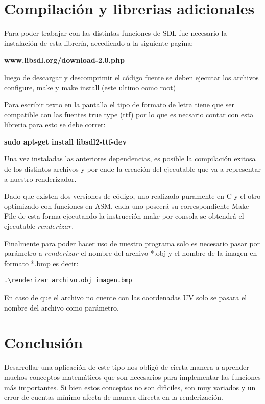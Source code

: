 \documentclass[a4paper]{article}
\begin{document}
\section{Compilación y librerias adicionales}

Para poder trabajar con las distintas funciones de SDL fue necesario la instalación de esta librería, accediendo a la siguiente pagina:  

\textbf{www.libsdl.org/download-2.0.php}

luego de descargar y descomprimir el código fuente se deben ejecutar los archivos configure, make y make install (este ultimo como root)


Para escribir texto en la pantalla el tipo de formato de letra tiene que ser compatible con las fuentes true type (ttf) por lo que es necsario contar con esta libreria para esto se debe correr: 


\textbf{sudo apt-get install libsdl2-ttf-dev}


Una vez instaladas las anteriores dependencias, es posible la compilación exitosa de los distintos archivos y por ende la creación del ejecutable que va a representar a nuestro renderizador.
\par Dado que existen dos versiones de código, uno realizado puramente en C y el otro optimizado con funciones en ASM, cada uno poseerá su correspondiente Make File de esta forma ejecutando la instrucción make por consola se obtendrá el ejecutable $renderizar$.
\par Finalmente para poder hacer uso de nuestro programa solo es necesario pasar por parámetro a $renderizar$ el nombre del archivo *.obj y el nombre de la imagen en formato *.bmp es decir:


\begin{verbatim}
.\renderizar archivo.obj imagen.bmp
\end{verbatim}



En caso de que el archivo no cuente con las coordenadas UV solo se pasara el nombre del archivo como parámetro.


\section{Conclusión}
Desarrollar una aplicación de este tipo nos obligó de cierta manera a aprender muchos conceptos matemáticos que son necesarios para implementar las funciones más importantes. Si bien estos conceptos no son dificiles, son muy variados y un error de cuentas mínimo afecta de manera directa en la renderización.
\end{document}
